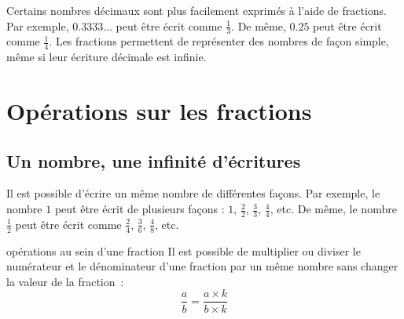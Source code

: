 \documentclass[12pt]{article}
\begin{document}







Certains nombres décimaux sont plus facilement exprimés à l'aide de fractions. Par exemple, $0.3333\ldots$ peut être écrit comme $\frac{1}{3}$. De même, $0.25$ peut être écrit comme $\frac{1}{4}$. Les fractions permettent de représenter des nombres de façon simple, même si leur écriture décimale est infinie.

\section{Opérations sur les fractions}

\subsection{Un nombre, une infinité d'écritures}

Il est possible d'écrire un même nombre de différentes façons. Par exemple, le nombre $1$ peut être écrit de plusieurs façons : $1$, $\frac{2}{2}$, $\frac{3}{3}$, $\frac{4}{4}$, etc. De même, le nombre $\frac{1}{2}$ peut être écrit comme $\frac{2}{4}$, $\frac{3}{6}$, $\frac{4}{8}$, etc.

\begin{proposition}{}{opérations au sein d'une fraction}
    Il est possible de multiplier ou diviser le numérateur et le dénominateur d'une fraction par un même nombre sans changer la valeur de la fraction~:
        $$\frac{a}{b} = \frac{a \times k}{b \times k}$$
\end{proposition}
\end{document}
